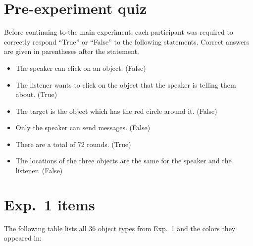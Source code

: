 \documentclass[11pt]{article}
\newcommand{\red}[1]{\textcolor{Red}{#1}}
\begin{document}
%

\section{Pre-experiment quiz}
\label{app:numdistractors}

Before continuing to the main experiment, each participant was required to correctly respond ``True'' or ``False'' to the following statements. Correct answers are given in parentheses after the statement.

\begin{itemize}
	\item The speaker can click on an object. (False)
	\item The listener wants to click on the object that the speaker is
  telling them about. (True)
  \item  The target is the object which has the red circle around it. (False)
  \item Only the speaker can send messages. (False)
  \item There are a total of 72 rounds. (True)
  \item The locations of the three objects are the same for the speaker and the listener. (False)
\end{itemize}


\section{Exp.~1 items}
\label{app:itemtypes}

The following table lists all 36 object types from Exp.~1 and the colors they appeared in:
\end{document}
